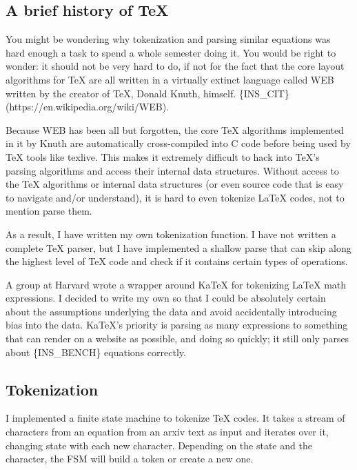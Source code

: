 \documentclass[]{article}
\begin{document}
\hypertarget{a-brief-history-of-tex}{%
\subsection{A brief history of TeX}\label{a-brief-history-of-tex}}

You might be wondering why tokenization and parsing similar equations
was hard enough a task to spend a whole semester doing it. You would be
right to wonder: it should not be very hard to do, if not for the fact
that the core layout algorithms for TeX are all written in a virtually
extinct language called WEB written by the creator of TeX, Donald Knuth,
himself. \{INS\_CIT\} (https://en.wikipedia.org/wiki/WEB).

Because WEB has been all but forgotten, the core TeX algorithms
implemented in it by Knuth are automatically cross-compiled into C code
before being used by TeX tools like texlive. This makes it extremely
difficult to hack into TeX's parsing algorithms and access their
internal data structures. Without access to the TeX algorithms or
internal data structures (or even source code that is easy to navigate
and/or understand), it is hard to even tokenize LaTeX codes, not to
mention parse them.

As a result, I have written my own tokenization function. I have not
written a complete TeX parser, but I have implemented a shallow parse
that can skip along the highest level of TeX code and check if it
contains certain types of operations.

A group at Harvard wrote a wrapper around KaTeX for tokenizing LaTeX
math expressions. I decided to write my own so that I could be
absolutely certain about the assumptions underlying the data and avoid
accidentally introducing bias into the data. KaTeX's priority is parsing
as many expressions to something that can render on a website as
possible, and doing so quickly; it still only parses about
\{INS\_BENCH\} equations correctly.

\hypertarget{tokenization}{%
\subsection{Tokenization}\label{tokenization}}

I implemented a finite state machine to tokenize TeX codes. It takes a
stream of characters from an equation from an arxiv text as input and
iterates over it, changing state with each new character. Depending on
the state and the character, the FSM will build a token or create a new
one.
\end{document}
